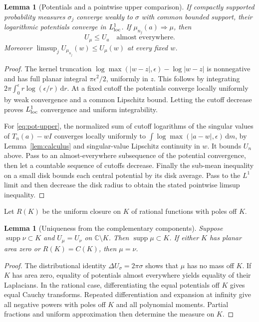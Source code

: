 \documentclass[11pt]{article}
\newtheorem{lemma}[theorem]{Lemma}
\theoremstyle{definition}
\newcommand{\C}{\mathbb C}
\newcommand{\dd}{\,\mathrm d}
\newcommand{\supp}{\operatorname{supp}}
\begin{document}
\begin{lemma}[Potentials and a pointwise upper comparison]\label{lem:potential}
If compactly supported probability measures $\sigma_j$ converge weakly to $\sigma$ with common bounded support, their logarithmic potentials converge in $L^1_{\rm loc}$. If $\mu_{n_j}(a)\Rightarrow\mu$, then
\begin{equation}
 U_\mu\le U_a\quad\text{almost everywhere}.
 \label{eq:pot-upper}
\end{equation}
Moreover $\limsup_j U_{\mu_{n_j}}(w)\le U_\mu(w)$ at every fixed $w$.
\end{lemma}
\begin{proof}
The kernel truncation $\log\max(|w-z|,\epsilon)-\log|w-z|$ is nonnegative and has full planar integral $\pi\epsilon^2/2$, uniformly in $z$. This follows by integrating $2\pi\int_0^\epsilon r\log(\epsilon/r)\dd r$. At a fixed cutoff the potentials converge locally uniformly by weak convergence and a common Lipschitz bound. Letting the cutoff decrease proves $L^1_{\rm loc}$ convergence and uniform integrability.

For \eqref{eq:pot-upper}, the normalized sum of cutoff logarithms of the singular values of $T_n(a)-wI$ converges locally uniformly to $\int\log\max(|a-w|,\epsilon)\dd m$, by Lemma~\ref{lem:calculus} and singular-value Lipschitz continuity in $w$. It bounds $U_n$ above. Pass to an almost-everywhere subsequence of the potential convergence, then let a countable sequence of cutoffs decrease. Finally the sub-mean inequality on a small disk bounds each central potential by its disk average. Pass to the $L^1$ limit and then decrease the disk radius to obtain the stated pointwise limsup inequality.
\end{proof}

Let $R(K)$ be the uniform closure on $K$ of rational functions with poles off $K$.
\begin{lemma}[Uniqueness from the complementary components]\label{lem:uniqueness}
Suppose $\supp\nu\subset K$ and $U_\mu=U_\nu$ on $\C\setminus K$. Then $\supp\mu\subset K$. If either $K$ has planar area zero or $R(K)=C(K)$, then $\mu=\nu$.
\end{lemma}
\begin{proof}
The distributional identity $\Delta U_\sigma=2\pi\sigma$ shows that $\mu$ has no mass off $K$. If $K$ has area zero, equality of potentials almost everywhere yields equality of their Laplacians. In the rational case, differentiating the equal potentials off $K$ gives equal Cauchy transforms. Repeated differentiation and expansion at infinity give all negative powers with poles off $K$ and all polynomial moments. Partial fractions and uniform approximation then determine the measure on $K$.
\end{proof}
\end{document}
